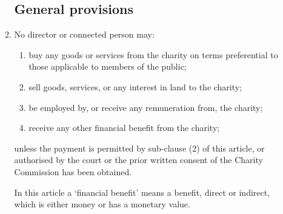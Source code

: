 \documentclass{article}
\begin{document}
\begin{enumerate}[label=\arabic*]
\begin{enumerate}[label=(\arabic*)]
        \subsection{General provisions}
        
        \item No director or connected person may:
        \begin{enumerate}[label=(\alph*)]
            \item buy any goods or services from the charity on terms
            preferential to those applicable to members of the public;
            \item sell goods, services, or any interest in land to the charity;
            \item be employed by, or receive any remuneration from,
            the charity;
            \item receive any other financial benefit from the charity;
        \end{enumerate}
        
        unless the payment is permitted by sub-clause (2) of this article,
        or authorised by the court or the prior written consent of the
        Charity Commission has been obtained.
        
        In this article a `financial benefit' means a benefit, direct or indirect,
        which is either money or has a monetary value.
        

\end{enumerate}
\end{enumerate}
\end{document}

